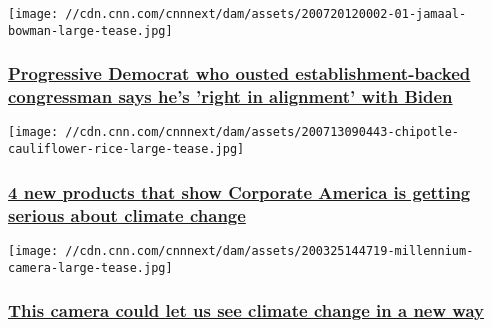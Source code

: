 \href{/2020/07/20/politics/jamaal-bowman-eliot-engel-cnntv/index.html}{}

\texttt{[image: //cdn.cnn.com/cnnnext/dam/assets/200720120002-01-jamaal-bowman-large-tease.jpg]}

\hypertarget{progressive-democrat-who-ousted-establishment-backed-congressman-says-hes-right-in-alignment-with-biden}{%
\subsubsection{\texorpdfstring{\href{/2020/07/20/politics/jamaal-bowman-eliot-engel-cnntv/index.html}{Progressive
Democrat who ousted establishment-backed congressman says he's 'right in
alignment' with
Biden}}{Progressive Democrat who ousted establishment-backed congressman says he's 'right in alignment' with Biden}}\label{progressive-democrat-who-ousted-establishment-backed-congressman-says-hes-right-in-alignment-with-biden}}

\href{/2020/07/18/business/new-environmentally-friendly-products/index.html}{}

\texttt{[image: //cdn.cnn.com/cnnnext/dam/assets/200713090443-chipotle-cauliflower-rice-large-tease.jpg]}

\hypertarget{4-new-products-that-show-corporate-america-is-getting-serious-about-climate-change}{%
\subsubsection{\texorpdfstring{\href{/2020/07/18/business/new-environmentally-friendly-products/index.html}{4
new products that show Corporate America is getting serious about
climate
change}}{4 new products that show Corporate America is getting serious about climate change}}\label{4-new-products-that-show-corporate-america-is-getting-serious-about-climate-change}}

\href{/2020/07/17/opinions/millennium-camera-keats-sutter/index.html}{}

\texttt{[image: //cdn.cnn.com/cnnnext/dam/assets/200325144719-millennium-camera-large-tease.jpg]}

\hypertarget{this-camera-could-let-us-see-climate-change-in-a-new-way}{%
\subsubsection{\texorpdfstring{\href{/2020/07/17/opinions/millennium-camera-keats-sutter/index.html}{This
camera could let us see climate change in a new
way}}{This camera could let us see climate change in a new way}}\label{this-camera-could-let-us-see-climate-change-in-a-new-way}}

